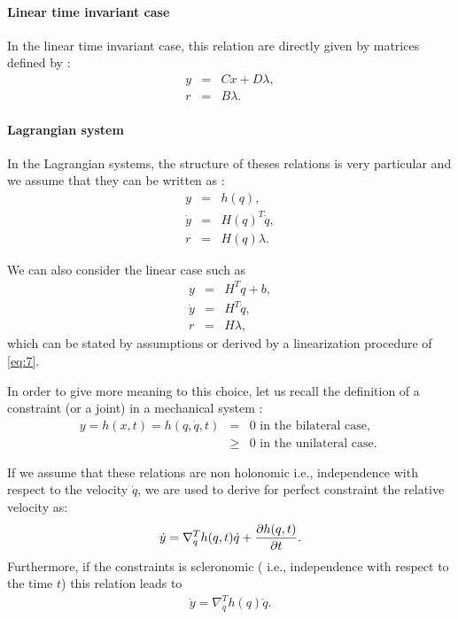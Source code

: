 \documentclass[10pt]{article}
\begin{document}
\paragraph{Linear time invariant case} In the linear time invariant case, this relation are directly given by matrices defined by :
\begin{eqnarray}
  \label{eq:6}
  y&=& C x + D \lambda, \\ 
  r&=& B \lambda.
\end{eqnarray}
 
\paragraph{Lagrangian system}
In the Lagrangian systems, the structure of theses relations is very particular  and we assume that they can be written as :
\begin{eqnarray}
  \label{eq:7}
   y&=& h(q),\\
   \dot y &=& H(q)^{T}\dot q, \\
   r &=& H(q) \lambda.
\end{eqnarray}

We can also consider the linear case such as 
\begin{eqnarray}
  \label{eq:8}
      y &=& H^{T} q + b,\\
      \dot y &=& H^{T}\dot q, \\
      r &=& H \lambda,
\end{eqnarray}
which can be stated by assumptions or derived by a linearization procedure of \eqref{eq:7}.

In order to give more meaning to this choice, let us recall the definition of a constraint (or a joint) in a  mechanical system :
\begin{eqnarray}
  \label{eq:9}
  y=h(x,t) = h(q,\dot q,t)  &=&0 \text{ in the bilateral case,}\\
 &\geq& 0 \text{ in the unilateral case. } 
\end{eqnarray}

 If we assume that these relations are non holonomic i.e., independence with respect to the velocity $\dot q$, we are used to derive for perfect constraint  the relative velocity as:
\begin{equation}
  \label{eq:10}
  \dot y= \nabla^T_q h(q,t) \dot q + \displaystyle \frac{\partial {h(q,t)}}{\partial {t}}.
\end{equation}
Furthermore, if the constraints is scleronomic ( i.e., independence with respect to the time  $t$) this relation leads to 
\begin{eqnarray}
  \label{eq:11}
   \dot y= \nabla^T_q h(q) \dot q.
\end{eqnarray}
\end{document}
